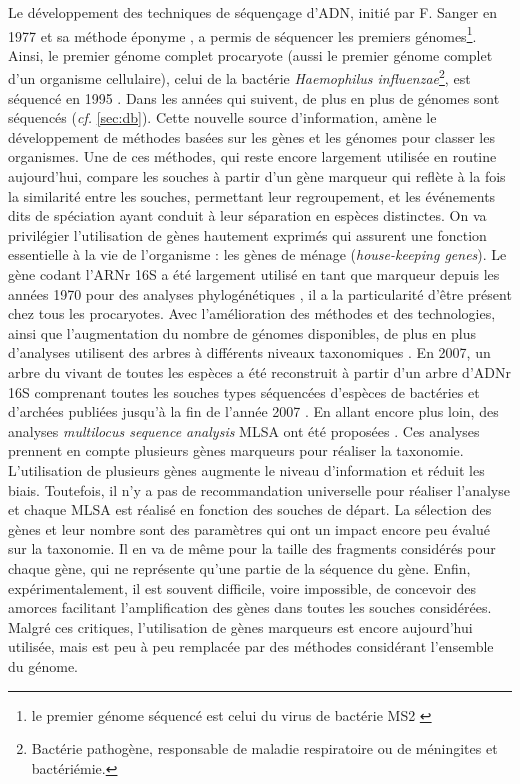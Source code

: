 Le développement des techniques de séquençage d'ADN, initié par F. Sanger en 1977 et sa méthode éponyme \cite{sanger_dna_1977}, a permis de séquencer les premiers génomes\footnote{le premier génome séquencé est celui du virus de bactérie MS2 \cite{fiers_complete_1976}}. Ainsi, le premier génome complet procaryote (aussi le premier génome complet d'un organisme cellulaire), celui de la bactérie \textit{Haemophilus influenzae}\footnote{Bactérie pathogène, responsable de maladie respiratoire ou de méningites et bactériémie.}, est séquencé en 1995 \cite{fleischmann_whole-genome_1995}. Dans les années qui suivent, de plus en plus de génomes sont séquencés (\textit{cf.} \autoref{sec:db}). Cette nouvelle source d'information, amène le développement de méthodes basées sur les gènes et les génomes pour classer les organismes. Une de ces méthodes, qui reste encore largement utilisée en routine aujourd'hui, compare les souches à partir d'un gène marqueur qui reflète à la fois la similarité entre les souches, permettant leur regroupement, et les événements dits de spéciation ayant conduit à leur séparation en espèces distinctes. On va privilégier l'utilisation de gènes hautement exprimés qui assurent une fonction essentielle à la vie de l'organisme : les gènes de ménage (\textit{house-keeping genes}). Le gène codant l'ARNr 16S a été largement utilisé en tant que marqueur depuis les années 1970 pour des analyses phylogénétiques \cite{balch_ancient_1977,stackebrandt_phylogenetic_1983}, il a la particularité d'être présent chez tous les procaryotes. Avec l'amélioration des méthodes et des technologies, ainsi que l'augmentation du nombre de génomes disponibles, de plus en plus d'analyses utilisent des arbres à différents niveaux taxonomiques \cite{ludwig_phylogenetic_1990,chun_phylogenetic_1995,lee_phylogenetic_2000,imhoff_phylogenetic_2003}. En 2007, un arbre du vivant de toutes les espèces a été reconstruit à partir d'un arbre d'ADNr 16S comprenant toutes les souches types séquencées d'espèces de bactéries et d'archées publiées jusqu'à la fin de l'année 2007 \cite{yarza_all-species_2008}. En allant encore plus loin, des analyses \textit{multilocus sequence analysis} MLSA ont été proposées \cite{stinear_comparative_2000,kuhnert_prediction_2006,pascual_multilocus_2010,glaeser_multilocus_2015}. Ces analyses prennent en compte plusieurs gènes marqueurs pour réaliser la taxonomie. L'utilisation de plusieurs gènes augmente le niveau d'information et réduit les biais. Toutefois, il n'y a pas de recommandation universelle pour réaliser l'analyse et chaque MLSA est réalisé en fonction des souches de départ. La sélection des gènes et leur nombre sont des paramètres qui ont un impact encore peu évalué sur la taxonomie. Il en va de même pour la taille des fragments considérés pour chaque gène, qui ne représente qu'une partie de la séquence du gène. Enfin, expérimentalement, il est souvent difficile, voire impossible, de concevoir des amorces facilitant l'amplification des gènes dans toutes les souches considérées. Malgré ces critiques, l'utilisation de gènes marqueurs est encore aujourd'hui utilisée, mais est peu à peu remplacée par des méthodes considérant l'ensemble du génome.

